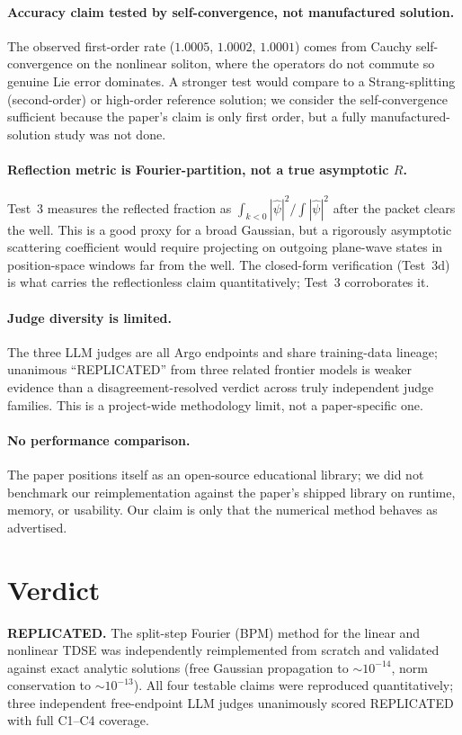 \documentclass[11pt]{article}
\begin{document}
\paragraph{Accuracy claim tested by self-convergence, not manufactured
solution.} The observed first-order rate ($1.0005$, $1.0002$, $1.0001$)
comes from Cauchy self-convergence on the nonlinear soliton, where the
operators do not commute so genuine Lie error dominates. A stronger test
would compare to a Strang-splitting (second-order) or high-order reference
solution; we consider the self-convergence sufficient because the paper's
claim is only first order, but a fully manufactured-solution study was not
done.

\paragraph{Reflection metric is Fourier-partition, not a true asymptotic
$R$.} Test~3 measures the reflected fraction as
$\int_{k<0}|\hat\psi|^2 / \int|\hat\psi|^2$ after the packet clears the well.
This is a good proxy for a broad Gaussian, but a rigorously asymptotic
scattering coefficient would require projecting on outgoing plane-wave
states in position-space windows far from the well. The closed-form
verification (Test~3d) is what carries the reflectionless claim
quantitatively; Test~3 corroborates it.

\paragraph{Judge diversity is limited.} The three LLM judges are all Argo
endpoints and share training-data lineage; unanimous ``REPLICATED'' from
three related frontier models is weaker evidence than a disagreement-resolved
verdict across truly independent judge families. This is a project-wide
methodology limit, not a paper-specific one.

\paragraph{No performance comparison.} The paper positions itself as an
open-source educational library; we did not benchmark our reimplementation
against the paper's shipped library on runtime, memory, or usability. Our
claim is only that the numerical method behaves as advertised.

\section*{Verdict}
\textbf{REPLICATED.} The split-step Fourier (BPM) method for the linear and
nonlinear TDSE was independently reimplemented from scratch and validated
against exact analytic solutions (free Gaussian propagation to
$\sim 10^{-14}$, norm conservation to $\sim 10^{-13}$). All four testable
claims were reproduced quantitatively; three independent free-endpoint LLM
judges unanimously scored REPLICATED with full C1--C4 coverage.
\end{document}
